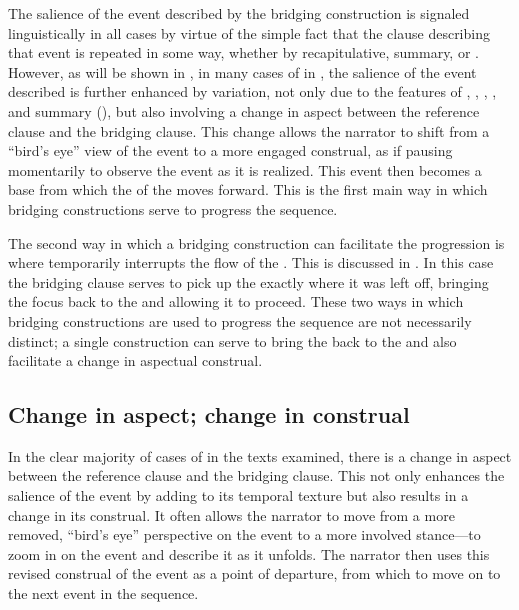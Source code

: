 \documentclass[output=paper]{LSP/langsci}
\begin{document}
The salience of the event described by the bridging construction is signaled linguistically in all cases by virtue of the simple fact that the clause describing that event is repeated in some way, whether by recapitulative, summary, or . However, as will be shown in  , in many cases of  in , the salience of the event described is further enhanced by variation, not only due to the features of , , , , and summary (), but also involving a change in aspect between the reference clause and the bridging clause. This change allows the narrator to shift from a ``bird’s eye'' view of the event to a more engaged construal, as if pausing momentarily to observe the event as it is realized. This event then becomes a base from which the  of the  moves forward. This  is the first main way in which bridging constructions serve to progress the  sequence.

The second way in which a bridging construction can facilitate the  progression is where  temporarily interrupts the flow of the . This is discussed in . In this case the bridging clause serves to pick up the  exactly where it was left off, bringing the focus back to the  and allowing it to proceed. These two ways in which bridging constructions are used to progress the  sequence are not necessarily distinct; a single construction can serve to bring the  back to the  and also facilitate a change in aspectual construal.


\subsection{Change in aspect; change in construal}
\label{JaChange}
In the clear majority of cases of  in the  texts examined, there is a change in aspect between the reference clause and the bridging clause. This not only enhances the salience of the event by adding to its temporal texture but also results in a change in its construal. It often allows the narrator to move from a more removed, ``bird’s eye'' perspective on the event to a more involved stance—to zoom in on the event and describe it as it unfolds. The narrator then uses this revised construal of the event as a point of departure, from which to move on to the next event in the  sequence. 
\end{document}
